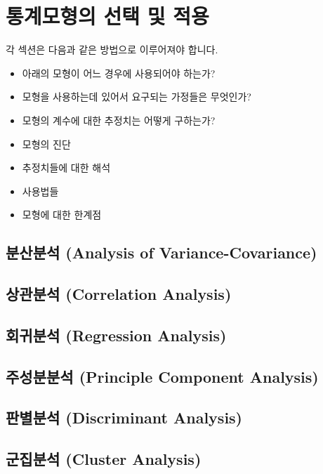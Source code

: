 \documentclass{report}
\begin{document}
%
%
%

\chapter{통계모형의 선택 및 적용}

각 섹션은 다음과 같은 방법으로 이루어져야 합니다. 
\begin{itemize}
\item 아래의 모형이 어느 경우에 사용되어야 하는가?
\item 모형을 사용하는데 있어서 요구되는 가정들은 무엇인가?
\item 모형의 계수에 대한 추정치는 어떻게 구하는가?
\item 모형의 진단
\item 추정치들에 대한 해석
\item 사용법들 
\item 모형에 대한 한계점
\end{itemize}

\section{분산분석 (Analysis of Variance-Covariance)}

\section{상관분석 (Correlation Analysis) }

\section{회귀분석 (Regression Analysis) }

\section{주성분분석 (Principle Component Analysis)}

\section{판별분석 (Discriminant Analysis) }

\section{군집분석 (Cluster Analysis) }
\end{document}

